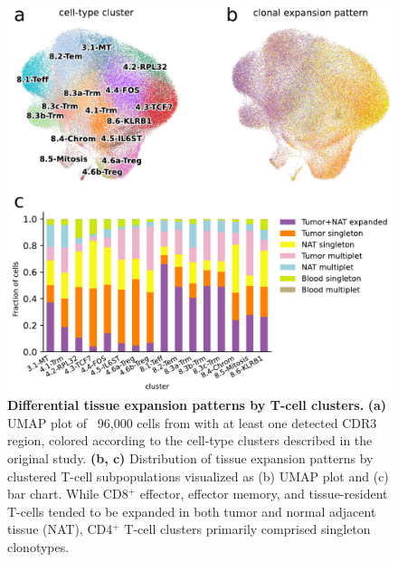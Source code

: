 \documentclass{article}
\begin{document}
\newpage
\begin{figure}[!ht]
  \centering
  \includegraphics[width=7in]{../figures/expansion_per_cluster.pdf}
  \caption{
    \textbf{Differential tissue expansion patterns by T-cell clusters.} 
    \textbf{(a)} UMAP plot of ~96,000 cells from \textcite{Wu2020-vp} with at least one 
    detected CDR3 region, colored according to the cell-type clusters described in the 
    original study. \textbf{(b, c)} Distribution of tissue expansion patterns by clustered 
    T-cell subpopulations visualized as (b) UMAP plot and (c) bar
    chart. While CD8$^+$ effector, effector memory, and tissue-resident T-cells tended 
    to be expanded in both tumor and normal adjacent tissue (NAT), CD4$^+$ T-cell clusters
    primarily comprised singleton clonotypes.}
\end{figure}
\end{document}
